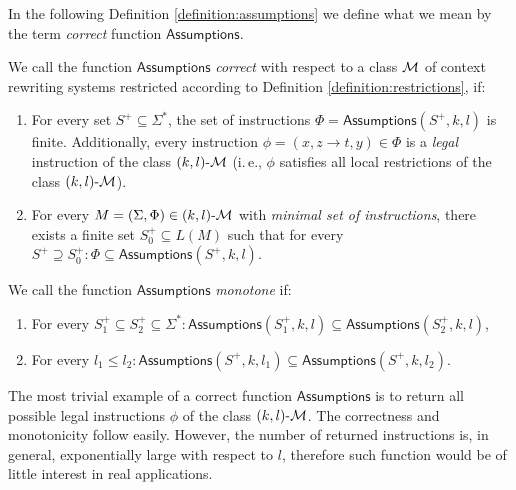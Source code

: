 In the following Definition \ref{definition:assumptions} we define what we mean by the term \emph{correct} function $\mathsf{Assumptions}$.

\begin{definition}\label{definition:assumptions}
We call the function $\mathsf{Assumptions}$ \emph{correct} with respect to a class $\textup{\sf $\mathcal{M}$}$ of context rewriting systems restricted according to Definition \ref{definition:restrictions}, if:
\begin{enumerate}
\item For every set $S^+ \subseteq \Sigma^*$, the set of instructions $\Phi = \mathsf{Assumptions}(S^+, k, l)$ is finite. Additionally, every instruction $\phi = (x, z \to t, y) \in \Phi$ is a \emph{legal} instruction of the class $\textup{\sf $(k,l)$-\textup{\sf $\mathcal{M}$}}$ (i.\,e., $\phi$ satisfies all local restrictions of the class $\textup{\sf $(k,l)$-\textup{\sf $\mathcal{M}$}}$).
\item For every $M = (\Sigma, \Phi) \in \textup{\sf $(k,l)$-\textup{\sf $\mathcal{M}$}}$  with \emph{minimal set of instructions}, there exists a finite set $S_0^+ \subseteq L(M)$ such that for every $S^+ \supseteq S_0^+: \Phi \subseteq \mathsf{Assumptions}(S^+, k, l)$.
\end{enumerate}
\end{definition}

\begin{definition}\label{definition:monotone-assumptions}
We call the function $\mathsf{Assumptions}$ \emph{monotone} if:
\begin{enumerate}
\item For every $S_1^+ \subseteq S_2^+ \subseteq \Sigma^*:
\mathsf{Assumptions}(S_1^+, k, l) \subseteq \mathsf{Assumptions}(S_2^+, k, l)$, 
\item For every $l_1 \le l_2:
\mathsf{Assumptions}(S^+, k, l_1) \subseteq \mathsf{Assumptions}(S^+, k, l_2)$.
\end{enumerate}
\end{definition}


\begin{example}
The most trivial example of a correct function $\mathsf{Assumptions}$ is to return all possible legal instructions $\phi$ of the class $\textup{\sf $(k,l)$-\textup{\sf $\mathcal{M}$}}$. The correctness and monotonicity follow easily. However, the number of returned instructions is, in general, exponentially large with respect to $l$, therefore such function would be of little interest in real applications.
\end{example}


